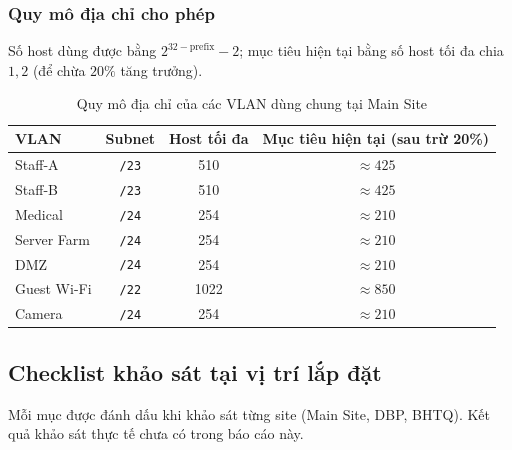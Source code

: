 \subsubsection{Quy mô địa chỉ cho phép}
Số host dùng được bằng $2^{32-\text{prefix}}-2$; mục tiêu hiện tại bằng số host tối đa chia $1{,}2$ (để chừa $20\%$ tăng trưởng).

\begin{small}
\begin{longtable}{|l|c|c|c|}
\caption{Quy mô địa chỉ của các VLAN dùng chung tại Main Site} \label{tab:addr_scale} \\
\hline
\textbf{VLAN} & \textbf{Subnet} & \textbf{Host tối đa} & \textbf{Mục tiêu hiện tại (sau trừ 20\%)} \\ \hline
\endhead
Staff-A & \texttt{/23} & 510 & $\approx 425$ \\ \hline
Staff-B & \texttt{/23} & 510 & $\approx 425$ \\ \hline
Medical & \texttt{/24} & 254 & $\approx 210$ \\ \hline
Server Farm & \texttt{/24} & 254 & $\approx 210$ \\ \hline
DMZ & \texttt{/24} & 254 & $\approx 210$ \\ \hline
Guest Wi-Fi & \texttt{/22} & 1022 & $\approx 850$ \\ \hline
Camera & \texttt{/24} & 254 & $\approx 210$ \\ \hline
\end{longtable}
\end{small}

\subsection{Checklist khảo sát tại vị trí lắp đặt}
\label{sec:step1-checklist}
Mỗi mục được đánh dấu khi khảo sát từng site (Main Site, DBP, BHTQ). Kết quả khảo sát thực tế chưa có trong báo cáo này.


